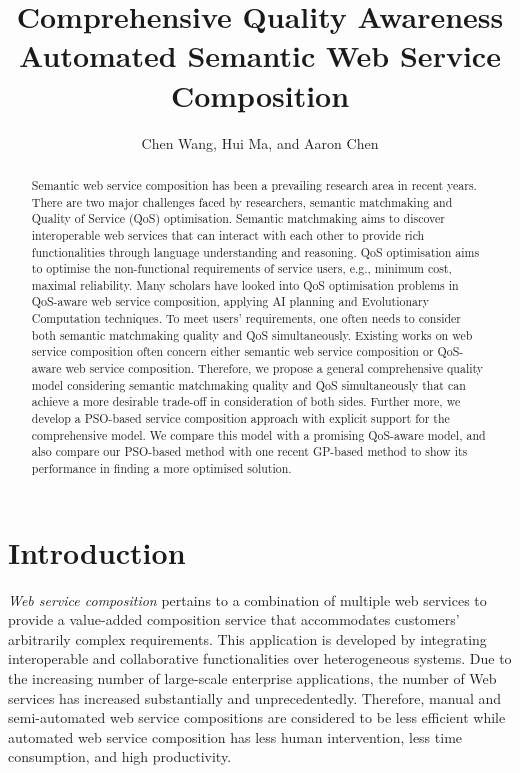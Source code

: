 \documentclass{llncs}
\title{Comprehensive Quality Awareness Automated Semantic Web Service Composition}
\author{Chen Wang, Hui Ma, and Aaron Chen}
\institute{School of Engineering and Computer Science,
\\Victoria University of Wellington, New Zealand \\
Email: \{chen.wang, hui.ma, aaron.chen\}@ecs.vuw.ac.nz}
\begin{document}
\maketitle
\begin{abstract}
Semantic web service composition has been a prevailing research area in recent years. There are two major challenges faced by researchers, semantic matchmaking and Quality of Service (QoS) optimisation. Semantic matchmaking aims to discover interoperable web services that can interact with each other to provide rich functionalities through language understanding and reasoning. QoS optimisation aims to optimise the non-functional requirements of service users, e.g., minimum cost, maximal reliability. Many scholars have looked into QoS optimisation problems in QoS-aware web service composition, applying AI planning and Evolutionary Computation techniques. To meet users' requirements, one often needs to consider both semantic matchmaking quality and QoS simultaneously. Existing works on web service composition often concern either semantic web  service composition or QoS-aware web service composition. Therefore, we propose a general comprehensive quality model considering semantic matchmaking quality and QoS simultaneously that can achieve a more desirable trade-off in consideration of both sides. Further more, we develop a PSO-based service composition approach with explicit support for the comprehensive model. We compare this model with a promising QoS-aware model, and also compare our PSO-based method with one recent GP-based method to show its performance in finding a more optimised solution.

\end{abstract}
\section{Introduction}\label{introduction}

\textit{Web service composition} pertains to a combination of multiple web services to provide a value-added composition service that accommodates customers' arbitrarily complex requirements. This application is developed by integrating interoperable and collaborative functionalities over heterogeneous systems. Due to the increasing number of large-scale enterprise applications, the number of Web services has increased substantially and unprecedentedly. Therefore, manual and semi-automated web service compositions are considered to be less efficient while automated web service composition has less human intervention, less time consumption, and high productivity.
\end{document}
